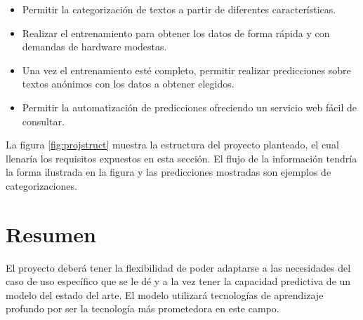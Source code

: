 \begin{itemize}
\item Permitir la categorización de textos a partir de diferentes características.
\item Realizar el entrenamiento para obtener los datos de forma rápida y con demandas de hardware modestas.
\item Una vez el entrenamiento esté completo, permitir realizar predicciones sobre textos anónimos con los datos a obtener elegidos.
\item Permitir la automatización de predicciones ofreciendo un servicio web fácil de consultar.
\end{itemize}

La figura \ref{fig:projstruct} muestra la estructura del proyecto planteado, el cual llenaría los requisitos expuestos en esta sección. El flujo de la información tendría la forma ilustrada en la figura y las predicciones mostradas son ejemplos de categorizaciones.

\section{Resumen}

El proyecto deberá tener la flexibilidad de poder adaptarse a las necesidades del caso de uso específico que se le dé y a la vez tener la capacidad predictiva de un modelo del estado del arte. El modelo utilizará tecnologías de aprendizaje profundo por ser la tecnología más prometedora en este campo.





